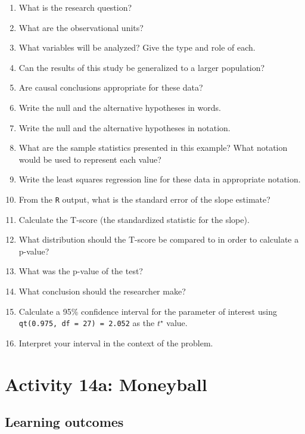 \documentclass[
]{report}
\newcommand{\rgs}{\vspace{12pt}} %
\begin{document}
\begin{enumerate}
\def\labelenumi{\arabic{enumi}.}
\item
  What is the research question?
  \rgs
\item
  What are the observational units?
  \rgs
\item
  What variables will be analyzed? Give the type and role of each.
  \rgs
  \rgs
\item
  Can the results of this study be generalized to a larger population?
  \rgs
\item
  Are causal conclusions appropriate for these data?
  \rgs
\item
  Write the null and the alternative hypotheses in words.
  \rgs
  \rgs
\item
  Write the null and the alternative hypotheses in notation.
  \rgs
\item
  What are the sample statistics presented in this example? What notation would be used to represent each value?
  \rgs
\item
  Write the least squares regression line for these data in appropriate notation.
  \rgs
\item
  From the \texttt{R} output, what is the standard error of the slope estimate?
  \rgs
\item
  Calculate the T-score (the standardized statistic for the slope).
  \rgs
  \rgs
\item
  What distribution should the T-score be compared to in order to calculate a p-value?
  \rgs
\item
  What was the p-value of the test?
  \rgs
\item
  What conclusion should the researcher make?
  \rgs
  \rgs
\item
  Calculate a 95\% confidence interval for the parameter of interest using \texttt{qt(0.975,\ df\ =\ 27)\ =\ 2.052} as the \(t^\star\) value.
  \rgs
  \rgs
\item
  Interpret your interval in the context of the problem.
  \rgs
  \rgs
\end{enumerate}

\newpage

\hypertarget{activity-14a-moneyball}{%
\section{Activity 14a: Moneyball}\label{activity-14a-moneyball}}


\hypertarget{learning-outcomes-9}{%
\subsection{Learning outcomes}\label{learning-outcomes-9}}
\end{document}
